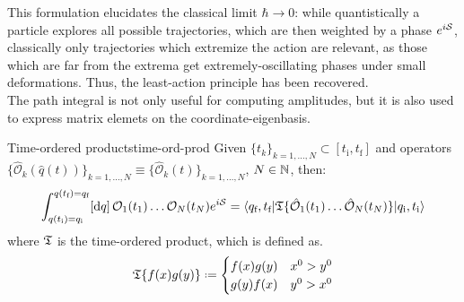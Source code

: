This formulation elucidates the classical limit $ \hbar \rightarrow 0 $: while quantistically a particle explores all possible trajectories, which are then weighted by a phase $ e^{i\mathcal{S}} $, classically only trajectories which extremize the action are relevant, as those which are far from the extrema get extremely-oscillating phases under small deformations. Thus, the least-action principle has been recovered. \\
The path integral is not only useful for computing amplitudes, but it is also used to express matrix elemets on the coordinate-eigenbasis.

\begin{lemma}{Time-ordered products}{time-ord-prod}
  Given $ \{t_k\}_{k = 1, \dots, N} \subset [t_\text{i} , t_\text{f}] $ and operators $ \{\hat{\mathcal{O}}_k(\hat{q}(t))\}_{k = 1, \dots, N} \equiv \{\hat{\mathcal{O}}_k(t)\}_{k = 1, \dots, N} $, $ N \in \mathbb{N} $, then:
  \begin{equation}
    \int_{q(t_\text{i}) = q_\text{i}}^{q(t_\text{f}) = q_\text{f}} [\mathrm{d} q]\, \mathcal{O}_1(t_1) \dots \mathcal{O}_N(t_N) e^{i \mathcal{S}} = \braket{q_\text{f},t_\text{f} | \mathfrak{T}\{\hat{\mathcal{O}}_1(t_1) \dots \hat{\mathcal{O}}_N(t_N)\} | q_\text{i},t_\text{i}}
  \end{equation}
  where $ \mathfrak{T} $ is the time-ordered product, which is defined as.
  \begin{equation}
    \tempord \{f(x) g(y)\} \defeq
    \begin{cases}
      f(x) g(y) & x^0 > y^0 \\
      g(y) f(x) & y^0 > x^0
    \end{cases}
  \end{equation}
\end{lemma}

